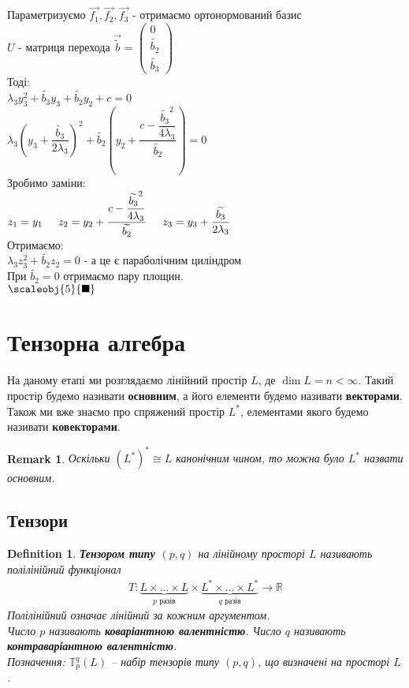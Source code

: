 \documentclass[a4paper, 10pt]{article}
\theoremstyle{theoremdd}
\newtheorem{definition}[theorem]{Definition}
\newtheorem{remark}[theorem]{Remark}
\begin{document}
Параметризуємо $\vec{f_1}, \vec{f_2}, \vec{f_3}$ - отримаємо ортонормований базис\\
$U$ - матриця перехода $\vec{\widetilde{b}} = \begin{pmatrix}
0 \\ \widetilde{b_2} \\ \widetilde{b_3}
\end{pmatrix}$\\
Тоді:\\
$\lambda_3 y_3^2 + \widetilde{b_3} y_3 + \widetilde{b_2} y_2 + c = 0$\\
$\lambda_3 \left(y_3 + \dfrac{\widetilde{b_3}}{2 \lambda_3} \right)^2 + \widetilde{b_2} \left(y_2 + \dfrac{c - \dfrac{\widetilde{b_3}^2}{4\lambda_3}}{\widetilde{b_2}} \right) = 0$\\
Зробимо заміни:\\
$z_1 = y_1 \hspace{0.5cm}
z_2 = y_2 + \dfrac{c - \dfrac{\widetilde{b_3}^2}{4\lambda_3}}{\widetilde{b_2}} \hspace{0.5cm}
z_3 = y_3 + \dfrac{\widetilde{b_3}}{2 \lambda_3}
$\\
Отримаємо:\\
$\lambda_3 z_3^2 + \widetilde{b_2} z_2 = 0$ - а це є параболічним циліндром\\
При $\widetilde{b_2} = 0$ отримаємо пару площин.\\
$\scaleobj{5}{\blacksquare}$
\newpage
\section{Тензорна алгебра}
На даному етапі ми розглядаємо лінійний простір $L$, де $\dim L = n < \infty$. Такий простір будемо називати \textbf{основним}, а його елементи будемо називати \textbf{векторами}.\\
Також ми вже знаємо про спряжений простір $L^*$, елементами якого будемо називати \textbf{ковекторами}.

\begin{remark}
Оскільки $(L^*)^* \cong L$ канонічним чином, то можна було $L^*$ назвати основним.
\end{remark}

\subsection{Тензори}
\begin{definition}
\textbf{Тензором типу $(p,q)$} на лінійному просторі $L$ називають полілінійний функціонал
\begin{align*}
T \colon \underbrace{L \times \dots \times L}_{p \text{  разів}} \times \underbrace{L^* \times \dots \times L^*}_{q \text{  разів}} \to \mathbb{R}
\end{align*}
Полілінійний означає лінійний за кожним аргументом.\\
Число $p$ називають \textbf{коваріантною валентністю}. Число $q$ називають \textbf{контраваріантною валентністю}.\\
Позначення: $\mathbb{T}_p^q(L)$ -- набір тензорів типу $(p,q)$, що визначені на просторі $L$.
\end{definition}
\end{document}
